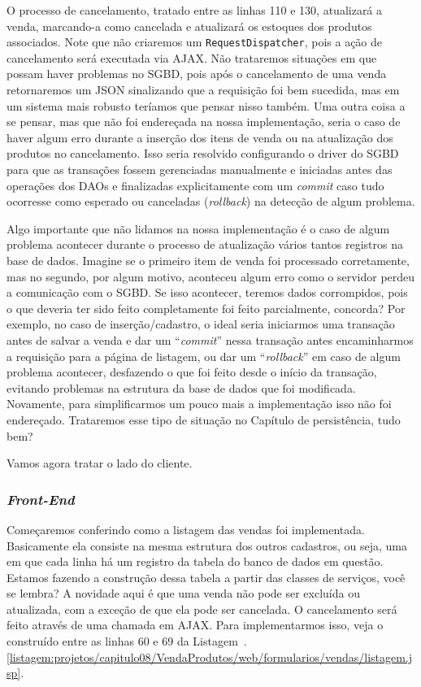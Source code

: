 O processo de cancelamento, tratado entre as linhas 110 e 130, atualizará a venda, marcando-a como cancelada e atualizará os estoques dos produtos associados. Note que não criaremos um \texttt{RequestDispatcher}, pois a ação de cancelamento será executada via AJAX. Não trataremos situações em que possam haver problemas no SGBD, pois após o cancelamento de uma venda retornaremos um JSON sinalizando que a requisição foi bem sucedida, mas em um sistema mais robusto teríamos que pensar nisso também. Uma outra coisa a se pensar, mas que não foi endereçada na nossa implementação, seria o caso de haver algum erro durante a inserção dos itens de venda ou na atualização dos produtos no cancelamento. Isso seria resolvido configurando o driver do SGBD para que as transações fossem gerenciadas manualmente e iniciadas antes das operações dos DAOs e finalizadas explicitamente com um \textit{commit} caso tudo ocorresse como esperado ou canceladas (\textit{rollback}) na detecção de algum problema.

Algo importante que não lidamos na nossa implementação é o caso de algum problema acontecer durante o processo de atualização vários tantos registros na base de dados. Imagine se o primeiro item de venda foi processado corretamente, mas no segundo, por algum motivo, aconteceu algum erro como o servidor perdeu a comunicação com o SGBD. Se isso acontecer, teremos dados corrompidos, pois o que deveria ter sido feito completamente foi feito parcialmente, concorda? Por exemplo, no caso de inserção/cadastro, o ideal seria iniciarmos uma transação antes de salvar a venda e dar um ``\textit{commit}'' nessa transação antes encaminharmos a requisição para a página de listagem, ou dar um ``\textit{rollback}'' em caso de algum problema acontecer, desfazendo o que foi feito desde o início da transação, evitando problemas na estrutura da base de dados que foi modificada. Novamente, para simplificarmos um pouco mais a implementação isso não foi endereçado. Trataremos esse tipo de situação no Capítulo de persistência, tudo bem?

Vamos agora tratar o lado do cliente.


\subsubsection{\textit{Front-End}}

Começaremos conferindo como a listagem das vendas foi implementada. Basicamente ela consiste na mesma estrutura dos outros cadastros, ou seja, uma  em que cada linha há um registro da tabela do banco de dados em questão. Estamos fazendo a construção dessa tabela a partir das classes de serviços, você se lembra? A novidade aqui é que uma venda não pode ser excluída ou atualizada, com a exceção de que ela pode ser cancelada. O cancelamento será feito através de uma chamada em AJAX. Para implementarmos isso, veja o  construído entre as linhas 60 e 69 da Listagem~\thechapter.\ref{listagem:projetos/capitulo08/VendaProdutos/web/formularios/vendas/listagem.jsp}.

